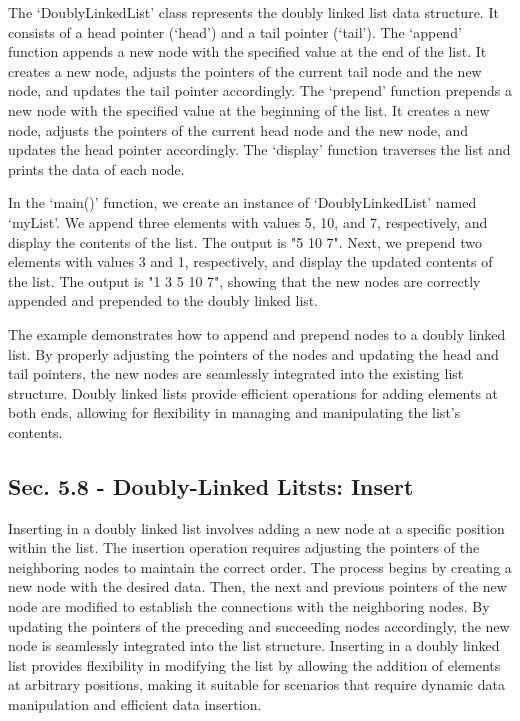 \begin{solution}
    The `DoublyLinkedList' class represents the doubly linked list data structure. It consists of a head pointer (`head') and a tail pointer (`tail'). The `append' function appends a new node with the specified value at the end of the list. It creates a new node, adjusts the pointers of the current tail node and 
    the new node, and updates the tail pointer accordingly. The `prepend' function prepends a new node with the specified value at the beginning of the list. It creates a new node, adjusts the pointers of the current head node and the new node, and updates the head pointer accordingly. The `display' function traverses 
    the list and prints the data of each node.

    In the `main()' function, we create an instance of `DoublyLinkedList' named `myList'. We append three elements with values 5, 10, and 7, respectively, and display the contents of the list. The output is "5 10 7". Next, we prepend two elements with values 3 and 1, respectively, and display the updated contents of 
    the list. The output is "1 3 5 10 7", showing that the new nodes are correctly appended and prepended to the doubly linked list.

    The example demonstrates how to append and prepend nodes to a doubly linked list. By properly adjusting the pointers of the nodes and updating the head and tail pointers, the new nodes are seamlessly integrated into the existing list structure. Doubly linked lists provide efficient operations for adding elements at 
    both ends, allowing for flexibility in managing and manipulating the list's contents.
\end{solution}

\subsection*{Sec. 5.8 - Doubly-Linked Litsts: Insert}

Inserting in a doubly linked list involves adding a new node at a specific position within the list. The insertion operation requires adjusting the pointers of the neighboring nodes to maintain the correct order. The process begins by creating a new node with the desired data. Then, the next and previous pointers of the 
new node are modified to establish the connections with the neighboring nodes. By updating the pointers of the preceding and succeeding nodes accordingly, the new node is seamlessly integrated into the list structure. Inserting in a doubly linked list provides flexibility in modifying the list by allowing the addition of 
elements at arbitrary positions, making it suitable for scenarios that require dynamic data manipulation and efficient data insertion.

